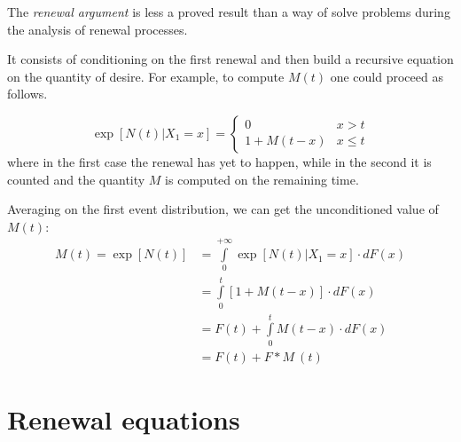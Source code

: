 

The \emph{renewal argument} is less a proved result than a way of solve problems during the analysis of renewal processes.

It consists of conditioning on the first renewal and then build a recursive equation on the quantity of desire. For example, to compute $M(t)$ one could proceed as follows.

\begin{equation}
	\exp[N(t)| X_1 = x] =
	\begin{cases}
	0 & x>t \\
	1+M(t-x) & x \le t
	\end{cases}
\end{equation}
where in the first case the renewal has yet to happen, while in the second it is counted and the quantity $M$ is computed on the remaining time.

Averaging on the first event distribution, we can get the unconditioned value of $M(t)$:
\begin{equation} \label{eq:mt_renewal_equation}
	\begin{split}
	M(t)= \exp[N(t)]&=\int\limits_0^{+\infty}\exp[N(t)|X_1=x] \cdot dF(x)\\
	&=\int\limits_0^{t}[1+M(t-x)] \cdot dF(x)\\
	&= F(t) + \int\limits_0^{t}M(t-x) \cdot dF(x)\\
	&= F(t) + F \ast M ~ (t)
	\end{split}
\end{equation}

\section{Renewal equations}

